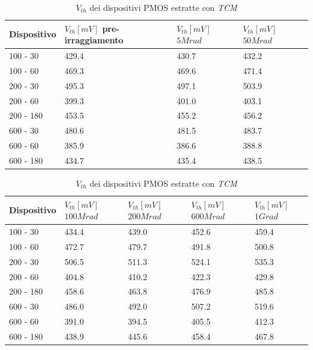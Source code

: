 \documentclass[12pt, letterpaper]{book}
\begin{document}
\begin{table}[htp] 
\renewcommand{\arraystretch}{1.3}
\caption{$V_{th}$ dei dispositivi PMOS estratte con \emph{TCM}}
\label{tab:VthTCM} 
\begin{center}
\begin{tabular}{m{2.5 cm} m{2.5 cm} m{2.5 cm} m{2.5 cm} }
\hline
Dispositivo &  $V_{th} [mV]$  pre-irraggiamento & $V_{th} [mV]$ $5Mrad$ & $V_{th} [mV]$ $50Mrad$ \\
\hline
100 - 30   &  429.4 & 430.7 & 432.2\\
\hline
100 - 60   &  469.3 & 469.6 & 471.4\\
\hline
200 - 30  &  495.3 & 497.1 & 503.9\\
\hline
200 - 60 & 399.3 & 401.0 & 403.1 \\
\hline
200 - 180 & 453.5 & 455.2 & 456.2 \\
\hline
600 - 30  & 480.6 & 481.5 & 483.7 \\
\hline
600 - 60 & 385.9 & 386.6 & 388.8 \\
\hline
600 - 180 & 434.7 & 435.4 & 438.5 \\
\hline

\end{tabular}


\begin{tabular}{m{2.5 cm} m{2.5 cm} m{2.5 cm} m{2.5 cm} m{2.5 cm}}
\hline
Dispositivo  & $V_{th}[mV]$ $100Mrad$ & $V_{th}[mV]$ $200Mrad$ & $V_{th}[mV]$ $600Mrad$ & $V_{th}[mV]$ $1Grad$ \\
\hline
100 - 30   & 434.4 &  439.0 & 452.6 & 459.4\\
\hline
100 - 60   & 472.7 & 479.7 & 491.8 & 500.8\\
\hline
200 - 30  & 506.5 & 511.3 & 524.1 & 535.3\\
\hline
200 - 60 & 404.8 & 410.2 & 422.3 & 429.8\\
\hline
200 - 180 & 458.6 & 463.8 & 476.9 & 485.8\\
\hline
600 - 30  & 486.0 & 492.0 & 507.2 & 519.6\\
\hline
600 - 60 & 391.0 & 394.5 & 405.5 & 412.3\\
\hline
600 - 180 & 438.9 & 445.6 & 458.4 & 467.8\\
\hline

\end{tabular}
\end{center}
\end{table} 
\end{document}
